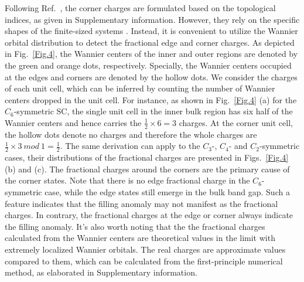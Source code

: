 \documentclass[doublecol]{epl2}
\begin{document}
Following Ref.~\cite{benalcazar2019quantization}, the corner charges are formulated based on the topological indices, as given in Supplementary information. However, they rely on the specific shapes of the finite-sized systems \cite{benalcazar2019quantization}. Instead, it is  convenient to utilize the Wannier orbital distribution to detect the fractional edge and corner charges. As depicted in Fig.~\ref{Fig.4}, the Wannier centers of the inner and  outer regions are denoted by the green and orange dots, respectively.  Specially, the Wannier centers occupied at the edges and corners are denoted by the hollow dots. We consider the charges of each unit cell, which can be inferred by counting the number of Wannier centers dropped in the unit cell. For instance, as shown in  Fig.~\ref{Fig.4} (a) for the $C_6$-symmetric SC, the single unit cell in the inner bulk region has six half of the Wannier centers and hence carries the $\frac{1}{2}\times6=3$ charges. At the corner unit cell, the hollow dots denote no charges and therefore the whole charges are  $\frac{1}{2}\times3\ mod\ 1=\frac{1}{2}$. The same derivation can apply to the $C_3$-, $C_4$- and $C_2$-symmetric cases, their distributions of the fractional charges are presented in  Figs.~\ref{Fig.4} (b) and (c). The fractional charges around the corners are the primary cause of the corner states. Note that there is no edge fractional charge  in the $C_6$-symmetric case, while the edge states still emerge in the bulk band gap. Such a feature indicates that the filling anomaly may not manifest as the fractional charges. In contrary, the fractional charges at the edge or corner always indicate the filling anomaly. It's also worth noting that the the fractional charges calculated from the Wannier centers are theoretical values in the limit with extremely localized Wannier orbitals. The real charges are approximate values compared to them, which can be calculated from the first-principle numerical method, as elaborated in Supplementary information.
\end{document}
